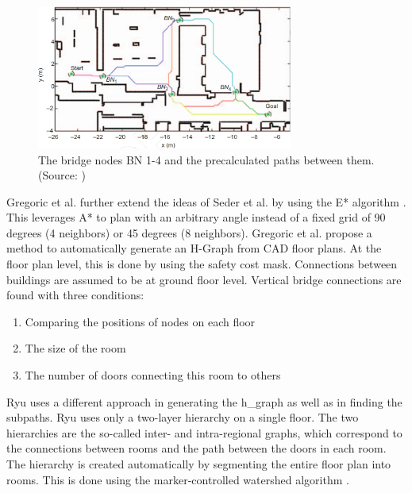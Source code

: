 \begin{figure}[h]
    \centering
    \includegraphics[width=0.75\textwidth]{figures/20_state_of_the_art/bridge_node_placement_paths.png}
    \caption[The bridge nodes with precalculated paths]{The bridge nodes BN 1-4 and the precalculated paths between them. (Source: \cite{seder_hierarchical_2011})}
    \label{fig:bridge_node_placement}
\end{figure}

Gregoric et al. \cite{gregoric_autonomous_2022} further extend the ideas of Seder et al. by using the E* algorithm \cite{philippsen_interpolated_2005}. This leverages A* to plan with an arbitrary angle instead of a fixed grid of 90 degrees (4 neighbors) or 45 degrees (8 neighbors). Gregoric et al. propose a method to automatically generate an H-Graph from CAD floor plans. At the floor plan level, this is done by using the safety cost mask. Connections between buildings are assumed to be at ground floor level. Vertical bridge connections are found with three conditions: 

\begin{enumerate}
    \item Comparing the positions of nodes on each floor
    \item The size of the room 
    \item The number of doors connecting this room to others
\end{enumerate}

Ryu \cite{ryu_hierarchical_2020} uses a different approach in generating the \gls{h_graph} as well as in finding the subpaths. Ryu uses only a two-layer hierarchy on a single floor. The two hierarchies are the so-called inter- and intra-regional graphs, which correspond to the connections between rooms and the path between the doors in each room. The hierarchy is created automatically by segmenting the entire floor plan into rooms. This is done using the marker-controlled watershed algorithm \cite{parvati_image_2009}. 

